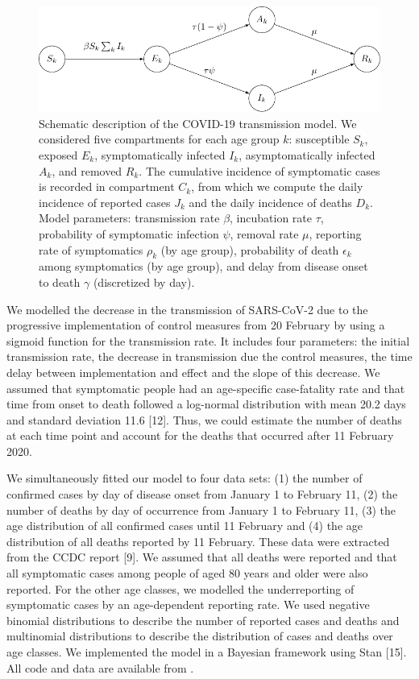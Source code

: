 \documentclass{article}
\begin{document}
\begin{figure}[H]
	\centering
	\includegraphics[width=.7\linewidth]{../figures/fig_ode.pdf}
	\caption{Schematic description of the COVID-19 transmission model. We considered five compartments for each age group $k$: susceptible $S_k$, exposed $E_k$, symptomatically infected $I_k$, asymptomatically infected $A_k$, and removed $R_k$. The cumulative incidence of symptomatic cases is recorded in compartment $C_k$, from which we compute the daily incidence of reported cases $J_k$ and the daily incidence of deaths $D_k$. Model parameters: transmission rate $\beta$, incubation rate $\tau$, probability of symptomatic infection $\psi$, removal rate $\mu$, reporting rate of symptomatics $\rho_k$ (by age group), probability of  death $\epsilon_k$ among symptomatics (by age group), and delay from disease onset to death $\gamma$ (discretized by day).}
	\label{fig:ode}
\end{figure}

We modelled the decrease in the transmission of SARS-CoV-2 due to the progressive implementation of control measures from 20 February by using a sigmoid function for the transmission rate. It includes four parameters: the initial transmission rate, the decrease in transmission due the control measures, the time delay between implementation and effect and the slope of this decrease. We assumed that symptomatic people had an age-specific case-fatality rate and that time from onset to death followed a log-normal distribution with mean 20.2 days and standard deviation 11.6 [12]. Thus, we could estimate the number of deaths at each time point and account for the deaths that occurred after 11 February 2020.

We simultaneously fitted our model to four data sets: (1) the number of confirmed cases by day of disease onset from January 1 to February 11, (2) the number of deaths by day of occurrence from January 1 to February 11, (3) the age distribution of all confirmed cases until 11 February and (4) the age distribution of all deaths reported by 11 February. These data were extracted from the CCDC report [9]. We assumed that all deaths were reported and that all symptomatic cases among people of aged 80 years and older were also reported. For the other age classes, we modelled the underreporting of symptomatic cases by an age-dependent reporting rate. We used negative binomial distributions to describe the number of reported cases and deaths and multinomial distributions to describe the distribution of cases and deaths over age classes. We implemented the model in a Bayesian framework using Stan [15]. All code and data are available from \underline{}.
\end{document}
